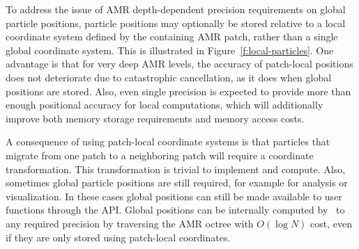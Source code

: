 \documentclass[10pt,twocolumn]{article}
\begin{document}
To address the issue of AMR depth-dependent precision requirements on
global particle positions, particle positions may optionally be stored
relative to a local coordinate system defined by the containing AMR
patch, rather than a single global coordinate system.  This is
illustrated in Figure~\ref{f:local-particles}.  One advantage is that
for very deep AMR levels, the accuracy of patch-local positions does
not deteriorate due to catastrophic cancellation, as it does when
global positions are stored.  Also, even single precision is expected
to provide more than enough positional accuracy for local
computations, which will additionally improve both memory storage
requirements and memory access costs.



A consequence of using patch-local coordinate systems is that
particles that migrate from one patch to a neighboring patch will
require a coordinate transformation.  This transformation is trivial
to implement and compute.  Also, sometimes global particle positions
are still required, for example for analysis or visualization.  In
these cases global positions can still be made available to user
functions through the \code{Particles} API.  Global positions can be
internally computed by \cello\ to any required precision by traversing
the AMR octree with $O(\log N)$ cost, even if they are only stored
using patch-local coordinates.
\end{document}
